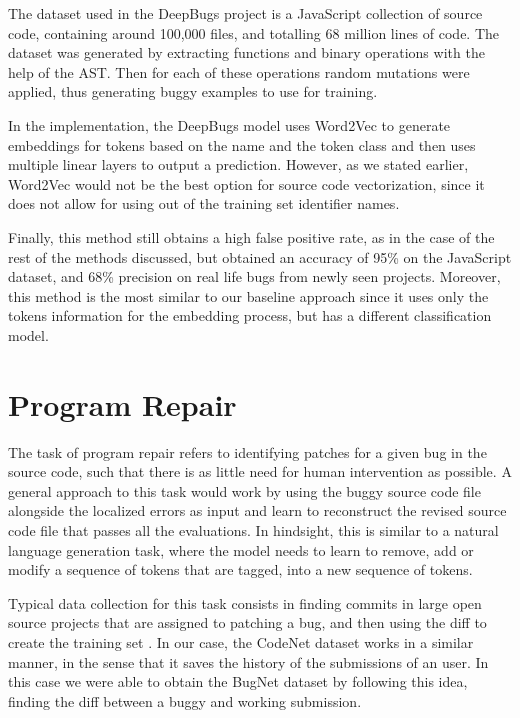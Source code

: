 \documentclass[12pt,a4paper]{report}
\begin{document}
The dataset used in the DeepBugs project is a JavaScript collection of source code, containing around 100,000 files, and totalling 68 million lines of code. The dataset was generated by extracting functions and binary operations with the help of the AST. Then for each of these operations random mutations were applied, thus generating buggy examples to use for training.

In the implementation, the DeepBugs model uses Word2Vec to generate embeddings for tokens based on the name and the token class and then uses multiple linear layers to output a prediction. However, as we stated earlier, Word2Vec would not be the best option for source code vectorization, since it does not allow for using out of the training set identifier names.

Finally, this method still obtains a high false positive rate, as in the case of the rest of the methods discussed, but obtained an accuracy of 95\% on the JavaScript dataset, and 68\% precision on real life bugs from newly seen projects. Moreover, this method is the most similar to our baseline approach since it uses only the tokens information for the embedding process, but has a different classification model.

\section{Program Repair}

The task of program repair refers to identifying patches for a given bug in the source code, such that there is as little need for human intervention as possible. A general approach to this task would work by using the buggy source code file alongside the localized errors as input and learn to reconstruct the revised source code file that passes all the evaluations. In hindsight, this is similar to a natural language generation task, where the model needs to learn to remove, add or modify a sequence of tokens that are tagged, into a new sequence of tokens.

Typical data collection for this task consists in finding commits in large open source projects that are assigned to patching a bug, and then using the diff to create the training set \cite{10.1145/3340544}. In our case, the CodeNet dataset works in a similar manner, in the sense that it saves the history of the submissions of an user. In this case we were able to obtain the BugNet dataset by following this idea, finding the diff between a buggy and working submission.
\end{document}
